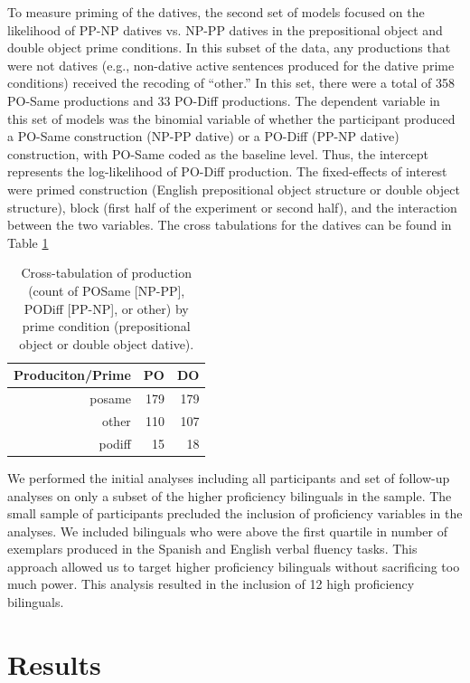 To measure priming of the datives, the second set of models focused on the likelihood of PP-NP datives vs. NP-PP datives in the prepositional object and double object prime conditions. In this subset of the data, any productions that were not datives (e.g., non-dative active sentences produced for the dative prime conditions) received the recoding of ``other.'' In this set, there were a total of 358 PO-Same productions and 33 PO-Diff productions. The dependent variable in this set of models was the binomial variable of whether the participant produced a PO-Same construction (NP-PP dative) or a PO-Diff (PP-NP dative) construction, with PO-Same coded as the baseline level. Thus, the intercept represents the log-likelihood of PO-Diff production. The fixed-effects of interest were primed construction (English prepositional object structure or double object structure), block (first half of the experiment or second half), and the interaction between the two variables. The cross tabulations for the datives can be found in Table \ref{tab:priming.crosstabs.dat}

\begin{table}[htbp]
  \centering
  \caption{Cross-tabulation of production (count of POSame [NP-PP], PODiff [PP-NP], or other) by prime condition (prepositional object or double object dative).}
    \begin{tabular}{rrr}
    \toprule
    Produciton/Prime & PO    & DO \\
    \midrule
    posame & 179   & 179 \\
    other & 110   & 107 \\
    podiff & 15    & 18 \\
    \bottomrule
    \end{tabular}%
  \label{tab:priming.crosstabs.dat}%
\end{table}%

We performed the initial analyses including all participants and set of follow-up analyses on only a subset of the higher proficiency bilinguals in the sample. The small sample of participants precluded the inclusion of proficiency variables in the analyses. We included bilinguals who were above the first quartile in number of exemplars produced in the Spanish and English verbal fluency tasks. This approach allowed us to target higher proficiency bilinguals without sacrificing too much power. This analysis resulted in the inclusion of 12 high proficiency bilinguals. 

\section{Results}
\label{results}

